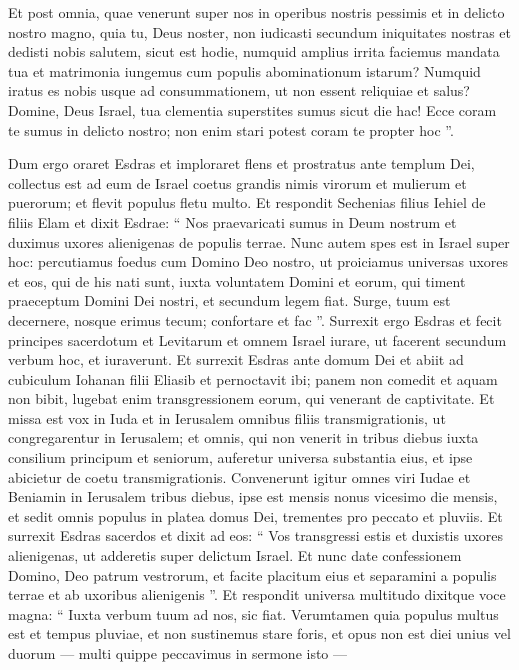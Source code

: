 \begin{biblechapter}
\begin{biblechapter}
\begin{biblechapter}
\begin{biblechapter}
\begin{biblechapter}
\begin{biblechapter}
\begin{biblechapter}
\begin{biblechapter}
\begin{biblechapter}
 \verse Et post omnia, quae venerunt super nos in operibus nostris pessimis et in delicto nostro magno, quia tu, Deus noster, non iudicasti secundum iniquitates nostras et dedisti nobis salutem, sicut est hodie, 
\verse numquid amplius irrita faciemus mandata tua et matrimonia iungemus cum populis abominationum istarum? Numquid iratus es nobis usque ad consummationem, ut non essent reliquiae et salus? 
\verse Domine, Deus Israel, tua clementia superstites sumus sicut die hac! Ecce coram te sumus in delicto nostro; non enim stari potest coram te propter hoc ”.
 
\begin{biblechapter}
\verse Dum ergo oraret Esdras et imploraret flens et prostratus ante templum Dei, collectus est ad eum de Israel coetus grandis nimis virorum et mulierum et puerorum; et flevit populus fletu multo. 
\verse Et respondit Sechenias filius Iehiel de filiis Elam et dixit Esdrae: “ Nos praevaricati sumus in Deum nostrum et duximus uxores alienigenas de populis terrae. Nunc autem spes est in Israel super hoc: 
\verse percutiamus foedus cum Domino Deo nostro, ut proiciamus universas uxores et eos, qui de his nati sunt, iuxta voluntatem Domini et eorum, qui timent praeceptum Domini Dei nostri, et secundum legem fiat. 
\verse Surge, tuum est decernere, nosque erimus tecum; confortare et fac ”.
 \verse Surrexit ergo Esdras et fecit principes sacerdotum et Levitarum et omnem Israel iurare, ut facerent secundum verbum hoc, et iuraverunt. 
\verse Et surrexit Esdras ante domum Dei et abiit ad cubiculum Iohanan filii Eliasib et pernoctavit ibi; panem non comedit et aquam non bibit, lugebat enim transgressionem eorum, qui venerant de captivitate.
 \verse Et missa est vox in Iuda et in Ierusalem omnibus filiis transmigrationis, ut congregarentur in Ierusalem; 
\verse et omnis, qui non venerit in tribus diebus iuxta consilium principum et seniorum, auferetur universa substantia eius, et ipse abicietur de coetu transmigrationis. 
\verse Convenerunt igitur omnes viri Iudae et Beniamin in Ierusalem tribus diebus, ipse est mensis nonus vicesimo die mensis, et sedit omnis populus in platea domus Dei, trementes pro peccato et pluviis.
 \verse Et surrexit Esdras sacerdos et dixit ad eos: “ Vos transgressi estis et duxistis uxores alienigenas, ut adderetis super delictum Israel. 
\verse Et nunc date confessionem Domino, Deo patrum vestrorum, et facite placitum eius et separamini a populis terrae et ab uxoribus alienigenis ”.
 \verse Et respondit universa multitudo dixitque voce magna: “ Iuxta verbum tuum ad nos, sic fiat. 
\verse Verumtamen quia populus multus est et tempus pluviae, et non sustinemus stare foris, et opus non est diei unius vel duorum — multi quippe peccavimus in sermone isto — 

\end{biblechapter}
\end{biblechapter}
\end{biblechapter}
\end{biblechapter}
\end{biblechapter}
\end{biblechapter}
\end{biblechapter}
\end{biblechapter}
\end{biblechapter}
\end{biblechapter}
